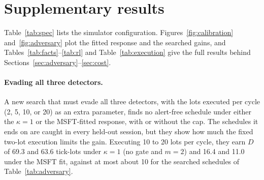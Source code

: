 \documentclass{article}
\begin{document}
\appendix

\section{Supplementary results}\label{sec:supp}

Table~\ref{tab:spec} lists the simulator configuration. Figures~\ref{fig:calibration} and~\ref{fig:adversary} plot the fitted response and the searched gains, and Tables~\ref{tab:facts}--\ref{tab:rl} and Table~\ref{tab:execution} give the full results behind Sections~\ref{sec:adversary}--\ref{sec:cost}.

\paragraph{Evading all three detectors.} A new search that must evade all three detectors, with the lots executed per cycle (2, 5, 10, or 20) as an extra parameter, finds no alert-free schedule under either the $\kappa = 1$ or the MSFT-fitted response, with or without the cap. The schedules it ends on are caught in every held-out session, but they show how much the fixed two-lot execution limits the gain. Executing 10 to 20 lots per cycle, they earn $D$ of 69.3 and 63.6 tick-lots under $\kappa = 1$ (no gate and $m = 2$) and 16.4 and 11.0 under the MSFT fit, against at most about 10 for the searched schedules of Table~\ref{tab:adversary}.
\end{document}

